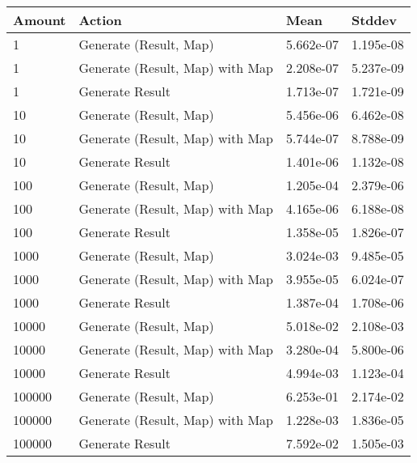 \begin{tabular}{llll}
\hline
 Amount   & Action                          & Mean      & Stddev    \\
\hline
 1        & Generate (Result, Map)          & 5.662e-07 & 1.195e-08 \\
 1        & Generate (Result, Map) with Map & 2.208e-07 & 5.237e-09 \\
 1        & Generate Result                 & 1.713e-07 & 1.721e-09 \\
 10       & Generate (Result, Map)          & 5.456e-06 & 6.462e-08 \\
 10       & Generate (Result, Map) with Map & 5.744e-07 & 8.788e-09 \\
 10       & Generate Result                 & 1.401e-06 & 1.132e-08 \\
 100      & Generate (Result, Map)          & 1.205e-04 & 2.379e-06 \\
 100      & Generate (Result, Map) with Map & 4.165e-06 & 6.188e-08 \\
 100      & Generate Result                 & 1.358e-05 & 1.826e-07 \\
 1000     & Generate (Result, Map)          & 3.024e-03 & 9.485e-05 \\
 1000     & Generate (Result, Map) with Map & 3.955e-05 & 6.024e-07 \\
 1000     & Generate Result                 & 1.387e-04 & 1.708e-06 \\
 10000    & Generate (Result, Map)          & 5.018e-02 & 2.108e-03 \\
 10000    & Generate (Result, Map) with Map & 3.280e-04 & 5.800e-06 \\
 10000    & Generate Result                 & 4.994e-03 & 1.123e-04 \\
 100000   & Generate (Result, Map)          & 6.253e-01 & 2.174e-02 \\
 100000   & Generate (Result, Map) with Map & 1.228e-03 & 1.836e-05 \\
 100000   & Generate Result                 & 7.592e-02 & 1.505e-03 \\
\hline
\end{tabular}